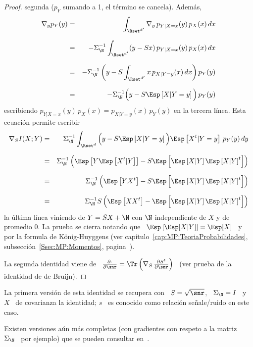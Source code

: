 \begin{proof}
  segunda ($p_Y$ sumando a 1, el t\'ermino se cancela). Adem\'as,
  \begin{eqnarray*}
  \nabla_y p_Y(y) & = & \int_{\Rset^{d'}} \nabla_y \, p_{Y|X=x}(y) \, p_X(x) \,
  dx\\[2.5mm]
  & = & - \Sigma_\N^{-1} \int_{\Rset^{d'}} (y - S x) \, p_{Y|X=x}(y) \, p_X(x) \,
  dx\\[2.5mm]
  & = & - \Sigma_\N^{-1} \left( y - S \int_{\Rset^{d'}} x \, p_{X|Y=y}(x) \,dx
  \right) p_Y(y)\\[2.5mm]
  & = & - \Sigma_\N^{-1} \Big( y - S \Esp\left[X | Y=y \right] \Big) \, p_Y(y)
  \end{eqnarray*}
  escribiendo $p_{Y|X=x}(y)  \, p_X(x) =  p_{X|Y=y}(x) \, p_Y(y)$ en  la tercera
  l\'inea. Esta ecuaci\'on permite escribir
  \begin{eqnarray*}
  \nabla_S I(X;Y) & = & \Sigma_\N^{-1} \int_{\Rset^d} \Big( y - S \Esp\left[X |
  Y=y \right] \Big) \Esp\left[X^t | Y=y \right] \, p_Y(y) \, dy\\[2.5mm]
  & = & \Sigma_\N^{-1} \left( \Esp\left[ Y \Esp\left[ X^t|Y \right] \right] - S
  \Esp\left[ \Esp\left[X | Y \right] \Esp\left[X | Y \right]^t \right]
  \right)\\[2.5mm]
  & = & \Sigma_\N^{-1} \left( \Esp\left[ Y X^t \right] - S \Esp\left[
  \Esp\left[X | Y \right] \Esp\left[X | Y \right]^t \right] \right)\\[2.5mm]
  & = & \Sigma_\N^{-1} S \left( \Esp\left[ X X^t \right] - \Esp\left[
  \Esp\left[X | Y \right] \Esp\left[X | Y \right]^t \right] \right)
  \end{eqnarray*}
  la \'ultima l\'inea viniendo de $Y  = S X + \N$ con $\N$ independiente
  de  $X$ y  de  promedio 0.   La prueba  se  cierra notando  que \  $\Esp\left[
    \Esp[X|Y] \right]  = \Esp[X]$  \ y por  la formula de  K\"onig-Huyggens (ver
  cap\'itulo~\ref{cap:MP:TeoriaProbabilidades},
  subsecci\'on~\ref{Ssec:MP:Momentos}, pagina~\pageref{Ssec:MP:Momentos}).

  La  segunda identidad  viene de  \ $\frac{\partial  \cdot}{\partial  \snr} =
  \Tr\left(  \nabla_S \,  \frac{\partial S^t}{\partial  \snr} \right)$  \ (ver
  prueba de la identidad de de Bruijn).
\end{proof}
%
\noindent  La  primera versi\'on  de  esta  identidad se  recupera  con  \ $S  =
\sqrt{\snr}$, \ $\Sigma_\N =  I$ \ y \ $X$ \ de  covarianza la identidad; $s$ \
es conocido como relaci\'on se\~nale/ruido en este caso.

Existen versiones a\'un m\'as completas  (con gradientes con respeto a la matriz
\  $\Sigma_\N$  \  por  ejemplo)  que se  pueden  consultar  en~\cite{Joh04,
  PalVer06, PayPal09}.



